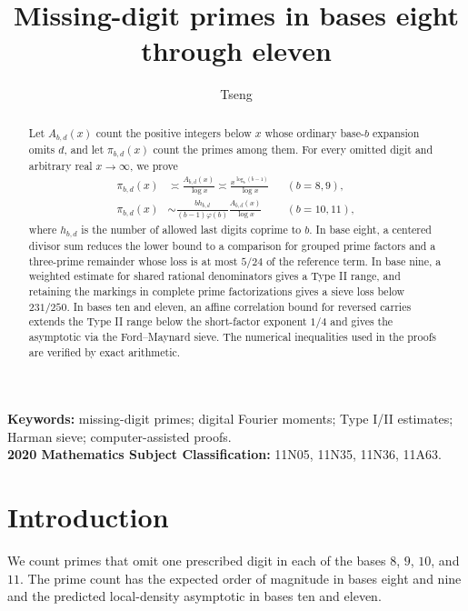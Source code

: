 \documentclass[11pt,a4paper]{article}
\title{\bfseries Missing-digit primes in bases eight through eleven}
\author{Tseng}
\date{}
\theoremstyle{paperplain}
\numberwithin{equation}{section}
\begin{document}
\maketitle
\begin{abstract}
Let $A_{b,d}(x)$ count the positive integers below $x$ whose ordinary
base-$b$ expansion omits $d$, and let $\pi_{b,d}(x)$ count the primes
among them. For every omitted digit and arbitrary real $x\to\infty$,
we prove
\[
 \begin{aligned}
 \pi_{b,d}(x)&\asymp \frac{A_{b,d}(x)}{\log x}
                 \asymp \frac{x^{\log_b(b-1)}}{\log x}
                      &&(b=8,9),\\[3pt]
 \pi_{b,d}(x)&\sim \frac{b h_{b,d}}{(b-1)\varphi(b)}
                       \frac{A_{b,d}(x)}{\log x}
                      &&(b=10,11),
 \end{aligned}
\]
where $h_{b,d}$ is the number of allowed last digits coprime to $b$.
In base eight, a centered divisor sum reduces the lower bound to a
comparison for grouped prime factors and a three-prime remainder
whose loss is at most $5/24$ of the reference term. In base nine, a
weighted estimate for shared rational denominators gives a Type II
range, and retaining the markings in complete prime factorizations
gives a sieve loss below $231/250$. In bases ten and eleven, an affine
correlation bound for reversed carries extends the Type II range
below the short-factor exponent $1/4$ and gives the asymptotic via the
Ford--Maynard sieve. The numerical inequalities used in the proofs
are verified by exact arithmetic.
\end{abstract}
\noindent\textbf{Keywords:} missing-digit primes; digital Fourier moments;
Type I/II estimates; Harman sieve; computer-assisted proofs.\\
\textbf{2020 Mathematics Subject Classification:} 11N05, 11N35, 11N36, 11A63.
\setcounter{tocdepth}{2}
\begingroup
\small
\linespread{.88}\selectfont
\setlength{\parskip}{0pt}
\tableofcontents
\endgroup
\setcounter{tocdepth}{2}
\newpage

\section{Introduction}
\label{sec:introduction}

We count primes that omit one prescribed digit in each of the bases
$8$, $9$, $10$, and $11$. The prime count has the expected order of
magnitude in bases eight and nine and the predicted local-density
asymptotic in bases ten and eleven.
\end{document}
